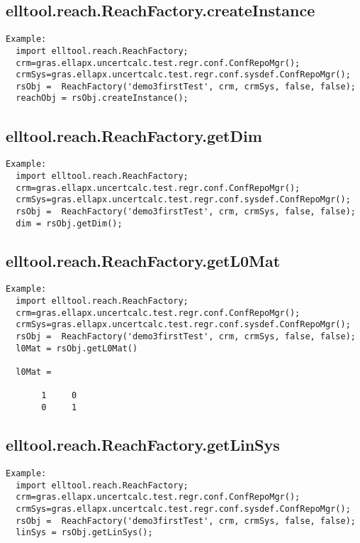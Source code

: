 \subsection{\texorpdfstring{elltool.reach.ReachFactory.createInstance}{createInstance}}\label{method:elltool.reach.ReachFactory.createInstance}
\begin{verbatim}
Example:
  import elltool.reach.ReachFactory;
  crm=gras.ellapx.uncertcalc.test.regr.conf.ConfRepoMgr();
  crmSys=gras.ellapx.uncertcalc.test.regr.conf.sysdef.ConfRepoMgr();
  rsObj =  ReachFactory('demo3firstTest', crm, crmSys, false, false);
  reachObj = rsObj.createInstance();
\end{verbatim}
\subsection{\texorpdfstring{elltool.reach.ReachFactory.getDim}{getDim}}\label{method:elltool.reach.ReachFactory.getDim}
\begin{verbatim}
Example:
  import elltool.reach.ReachFactory;
  crm=gras.ellapx.uncertcalc.test.regr.conf.ConfRepoMgr();
  crmSys=gras.ellapx.uncertcalc.test.regr.conf.sysdef.ConfRepoMgr();
  rsObj =  ReachFactory('demo3firstTest', crm, crmSys, false, false);
  dim = rsObj.getDim();
\end{verbatim}
\subsection{\texorpdfstring{elltool.reach.ReachFactory.getL0Mat}{getL0Mat}}\label{method:elltool.reach.ReachFactory.getL0Mat}
\begin{verbatim}
Example:
  import elltool.reach.ReachFactory;
  crm=gras.ellapx.uncertcalc.test.regr.conf.ConfRepoMgr();
  crmSys=gras.ellapx.uncertcalc.test.regr.conf.sysdef.ConfRepoMgr();
  rsObj =  ReachFactory('demo3firstTest', crm, crmSys, false, false);
  l0Mat = rsObj.getL0Mat()

  l0Mat =

       1     0
       0     1
\end{verbatim}
\subsection{\texorpdfstring{elltool.reach.ReachFactory.getLinSys}{getLinSys}}\label{method:elltool.reach.ReachFactory.getLinSys}
\begin{verbatim}
Example:
  import elltool.reach.ReachFactory;
  crm=gras.ellapx.uncertcalc.test.regr.conf.ConfRepoMgr();
  crmSys=gras.ellapx.uncertcalc.test.regr.conf.sysdef.ConfRepoMgr();
  rsObj =  ReachFactory('demo3firstTest', crm, crmSys, false, false);
  linSys = rsObj.getLinSys();
\end{verbatim}
